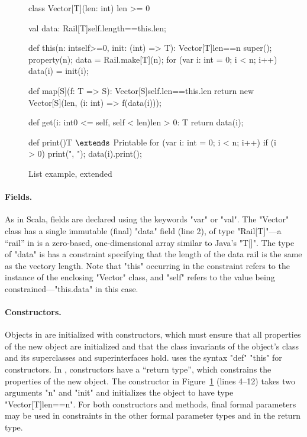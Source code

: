 \begin{figure}
{\footnotesize
\begin{numberedxten}
class Vector[T](len: int) {len >= 0} {
  val data: Rail[T]{self.length==this.len};

  def this(n: int{self>=0}, init: (int) => T):
        Vector[T]{len==n} {
    super();
    property(n);
    data = Rail.make[T](n);
    for (var i: int = 0; i < n; i++) {
      data(i) = init(i);
    }
  }

  def map[S](f: T => S): Vector[S]{self.len==this.len} {
    return new Vector[S](len, (i: int) => f(data(i)));
  }

  def get(i: int{0 <= self, self < len}){len > 0}: T {
    return data(i);
  }

  def print(){T $\extends$ Printable} {
    for (var i: int = 0; i < n; i++) {
      if (i > 0)
        print(", ");
      data(i).print();
    }
  }
}
\end{numberedxten}}
\caption{List example, extended}
\label{fig:vector}
\end{figure}

\paragraph{Fields.}

As in Scala, fields are declared using the keywords \xcd"var"
or \xcd"val".  The \xcd"Vector" class has a single
immutable (final) \xcd"data" field (line 2), of type \xcd"Rail[T]"---a ``rail'' in \Xten is a zero-based, one-dimensional array similar to Java's \xcd"T[]".
The type of \xcd"data" is
              has a constraint specifying that the length of
the data rail is the same as the vectory length.
Note that \xcd"this" occurring
in the constraint refers to the instance of the enclosing
\xcd"Vector" class,
and \xcd"self" refers to the value being
constrained---\xcd"this.data" in this case.

\paragraph{Constructors.}

Objects in \Xten{} are initialized with constructors, which
must ensure that all properties of the new object
are initialized and that the class invariants of the object's
class and its superclasses and superinterfaces hold.
\Xten{} uses the syntax \xcd"def" \xcd"this" for constructors.
In \Xten{}, constructors have a ``return type'', which constrains
the properties of the new object.  The constructor in
Figure~\ref{fig:vector} (lines 4--12) takes
two arguments \xcd"n" and \xcd"init" and 
initializes the
object to have type \xcd"Vector[T]{len==n}".
For both constructors and methods,
final formal parameters may be used in constraints
in the 
other formal parameter types and in the return type.

